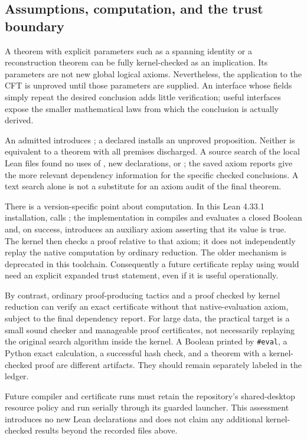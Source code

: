 \subsection{Assumptions, computation, and the trust boundary}

A theorem with explicit parameters such as a spanning identity or a
reconstruction theorem can be fully kernel-checked as an implication.
Its parameters are not new global logical axioms. Nevertheless, the
application to the CFT is unproved until those parameters are supplied.
An interface whose fields simply repeat the desired conclusion adds
little verification; useful interfaces expose the smaller mathematical
laws from which the conclusion is actually derived.

An admitted  introduces ; a declared
 installs an unproved proposition. Neither is equivalent
to a theorem with all premises discharged. A source search of the local
 Lean files found no uses of ,
new  declarations, or ; the saved
axiom reports give the more relevant dependency information for the
specific checked conclusions. A text search alone is not a substitute
for an axiom audit of the final theorem.

There is a version-specific point about computation. In this Lean
4.33.1 installation,  calls
; the implementation in
 compiles and evaluates a closed Boolean
and, on success, introduces an auxiliary axiom asserting that its value
is true. The kernel then checks a proof relative to that axiom; it does
not independently replay the native computation by ordinary reduction.
The older  mechanism is deprecated in this
toolchain. Consequently a future certificate replay using
 would need an explicit expanded trust statement,
even if it is useful operationally.

By contrast, ordinary proof-producing tactics and a 
proof checked by kernel reduction can verify an exact certificate
without that native-evaluation axiom, subject to the final dependency
report. For large data, the practical target is a small sound checker
and manageable proof certificates, not necessarily replaying the
original search algorithm inside the kernel. A Boolean printed by
\texttt{\#eval}, a Python exact calculation, a successful hash check,
and a theorem with a kernel-checked proof are different artifacts.
They should remain separately labeled in the ledger.

Future compiler and certificate runs must retain the repository's
shared-desktop resource policy and run serially through its guarded
launcher. This assessment introduces no new Lean declarations and
does not claim any additional kernel-checked results beyond the
recorded files above.
